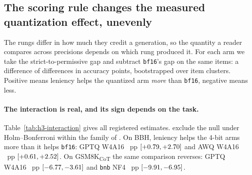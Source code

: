 \documentclass[11pt]{article}
\begin{document}
\subsection{The scoring rule changes the measured quantization effect, unevenly}
\label{sec:h3}


The rungs differ in how much they credit a generation, so the quantity a reader
compares across precisions depends on which rung produced it. For each arm we
take the strict-to-permissive gap and subtract \texttt{bf16}'s gap on the same
items: a difference of differences in accuracy points, bootstrapped over item
clusters. Positive means leniency helps the quantized arm \emph{more} than
\texttt{bf16}, negative means less.

\begin{table}[t]
\centering
\small

\caption{Precision $\times$ scoring interaction in accuracy points against
\texttt{bf16}, under strict versus permissive extraction, on \hThreeRecords{}
generations.
\textbf{Bold} excludes the null. $\dagger$ marks a worst-case bound rather than a
bootstrap interval: ARC-C's estimate is \emph{exactly} zero, so there is nothing
to resample and the interval is the Wilson zero-event bound
(\S\ref{sec:h5h6}).}
\label{tab:h3-interaction}
\end{table}

\paragraph{The interaction is real, and its sign depends on the task.}
Table~\ref{tab:h3-interaction} gives all \hThreeRows{} registered estimates.
\hThreeExcludesNull{} exclude the null under Holm--Bonferroni within the family
of \hThreeHolmM. On BBH, leniency helps the 4-bit arms more than it helps
\texttt{bf16}: GPTQ W4A16 \hThreeBbhGptqFour{}~pp
$[+0.79, +2.70]$ and AWQ W4A16 \hThreeBbhAwq{}~pp
$[+0.61, +2.52]$. On GSM8K\textsubscript{CoT} the same
comparison reverses: GPTQ W4A16 \hThreeGsmGptqFour{}~pp
$[-6.77, -3.61]$ and \texttt{bnb} NF4
\hThreeGsmNfFour{}~pp $[-9.91, -6.95]$.
\end{document}
